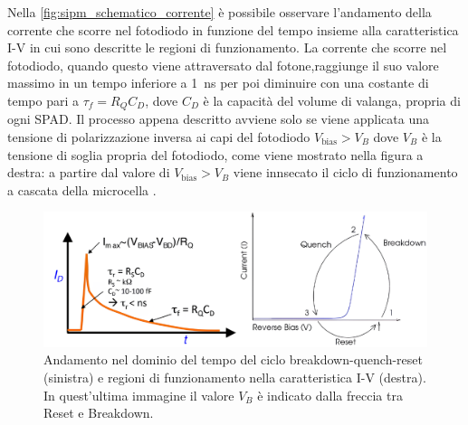 Nella \autoref*{fig:sipm_schematico_corrente} è possibile osservare l'andamento della corrente che scorre nel fotodiodo in funzione del tempo 
insieme alla caratteristica I-V in cui sono descritte le regioni di funzionamento. La corrente che scorre nel fotodiodo, quando questo viene
attraversato dal fotone,raggiunge il suo valore massimo in un tempo inferiore a \SI{1}{\nano\second} per poi diminuire con una costante di tempo
pari a $\tau_f=R_QC_D$, dove $C_D$ è la capacità del volume di valanga, propria di ogni SPAD. Il processo appena descritto avviene solo se viene
applicata una tensione di polarizzazione inversa ai capi del fotodiodo $V_\text{bias}>V_B$ dove $V_B$ è la tensione di soglia propria del fotodiodo, 
come viene mostrato nella figura a destra: a partire dal valore di $V_\text{bias}>V_B$ viene innsecato il ciclo di funzionamento a cascata della microcella \cite{linssen_2023_eurizon}.  
\begin{figure}[h!]
    \centering
    \includegraphics[width=1\linewidth]{img/ciclo_fotodiodo_corrente.png}
    \caption{Andamento nel dominio del tempo del ciclo breakdown-quench-reset (sinistra) e regioni di funzionamento nella
    caratteristica I-V (destra). In quest'ultima immagine il valore $V_B$ è indicato dalla freccia tra Reset e Breakdown.}
    \label{fig:sipm_schematico_corrente}
\end{figure}

